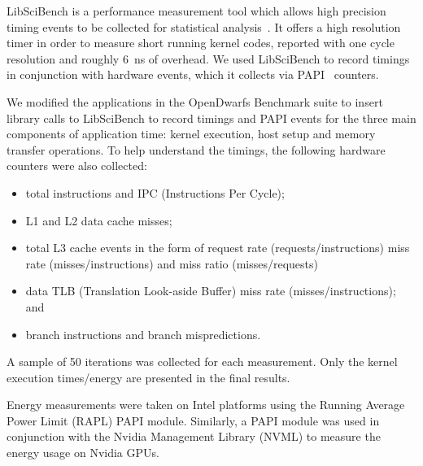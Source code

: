 \documentclass[../document.tex]{subfiles}
\begin{document}
\label{ssec:measurements}

LibSciBench is a performance measurement tool which allows high precision timing events to be collected for statistical analysis~\cite{hoefler2015scientific}.
It offers a high resolution timer in order to measure short running kernel codes, reported with one cycle resolution and roughly \SI{6}{\nano\second} of overhead.
We used LibSciBench to record timings in conjunction with hardware events, which it collects via PAPI~\cite{mucci1999papi} counters.

We modified the applications in the OpenDwarfs Benchmark suite to insert library calls to LibSciBench to record timings and PAPI events for the three main components of application time: kernel execution, host setup and memory transfer operations.
To help understand the timings, the following hardware counters were also collected:
\begin{itemize}
	\item total instructions and IPC (Instructions Per Cycle);
	\item L1 and L2 data cache misses;
	\item total L3 cache events in the form of request rate (requests/instructions) miss rate (misses/instructions) and miss ratio (misses/requests)
	\item data TLB (Translation Look-aside Buffer) miss rate (misses/instructions); and
	\item branch instructions and branch mispredictions.
\end{itemize}

A sample of 50 iterations was collected for each measurement.
Only the kernel execution times/energy are presented in the final results.

Energy measurements were taken on Intel platforms using the Running Average Power Limit (RAPL) PAPI module.
Similarly, a PAPI module was used in conjunction with the Nvidia Management Library (NVML) to measure the energy usage on Nvidia GPUs.
\end{document}
